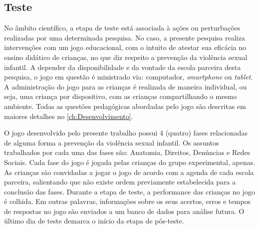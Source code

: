 \subsection{Teste}\label{subsec:teste}

No âmbito científico, a etapa de teste está associada à ações ou perturbações realizadas por uma determinada pesquisa. No caso, a presente pesquisa realiza intervenções com um jogo educacional, com o intuito de atestar sua eficácia no ensino didático de crianças, no que diz respeito a prevenção da violência sexual infantil. A depender da disponibilidade e da vontade da escola parceira desta pesquisa, o jogo em questão é ministrado via: computador, \textit{smartphone} ou \textit{tablet}. A administração do jogo para as crianças é realizada de maneira individual, ou seja, uma criança por dispositivo, com as crianças compartilhando o mesmo ambiente. Todas as questões pedagógicas abordadas pelo jogo são descritas em maiores detalhes no \autoref{ch:Desenvolvimento}. 

O jogo desenvolvido pelo presente trabalho possui 4 (quatro) fases relacionadas de alguma forma a prevenção da violência sexual infantil. Os assuntos trabalhados por cada uma das fases são: Anatomia, Direitos, Denúncias e Redes Sociais. Cada fase do jogo é jogada pelas crianças do grupo experimental, apenas. As crianças são convidadas a jogar o jogo de acordo com a agenda de cada escola parceira, salientando que não existe ordem previamente estabelecida para a conclusão das fases. Durante a etapa de teste, a performance das crianças no jogo é colhida. Em outras palavras, informações sobre os seus acertos, erros e tempos de respostas no jogo são enviados a um banco de dados para análise futura. O último dia de teste demarca o início da etapa de pós-teste. 




